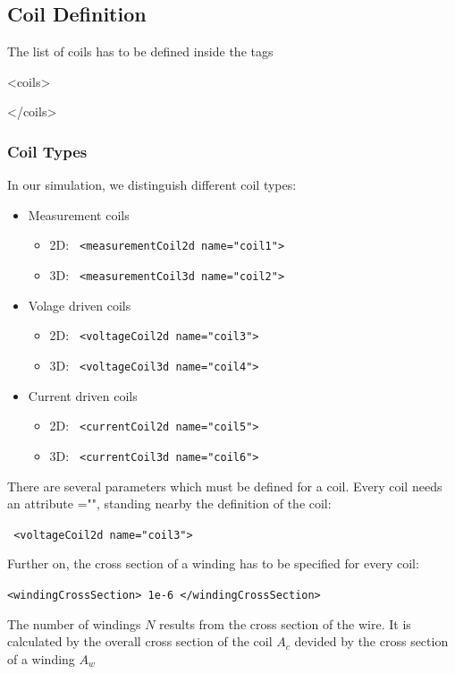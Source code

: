 \subsection{Coil Definition}

The list of coils has to be defined inside the tags

\begin{xmllisting}
<coils>

</coils>
\end{xmllisting}

\subsubsection{Coil Types}

In our simulation, we distinguish different coil types:
\begin{itemize}
\item Measurement coils
  \begin{itemize}
  \item 2D: \verb! <measurementCoil2d name="coil1">!
  \item 3D: \verb! <measurementCoil3d name="coil2">!
  \end{itemize}
\item Volage driven coils 
  \begin{itemize}
  \item 2D: \verb! <voltageCoil2d name="coil3">!
  \item 3D: \verb! <voltageCoil3d name="coil4">!
  \end{itemize}
\item Current driven coils 
  \begin{itemize}
  \item 2D: \verb! <currentCoil2d name="coil5">!
  \item 3D: \verb! <currentCoil3d name="coil6">!
  \end{itemize}
\end{itemize}

There are several parameters which must be defined for a coil. Every
coil needs an attribute {=""}, standing nearby
the
definition of the coil:

\verb! <voltageCoil2d name="coil3">!

\noindent
Further on, the cross section of a winding has to be
specified for every coil:

\verb!<windingCrossSection> 1e-6 </windingCrossSection>!

\noindent
The number of windings $N$ results from the cross section of the wire. It
is calculated by the overall cross section of the coil $A_c$ devided
by the cross section of a winding $A_w$

